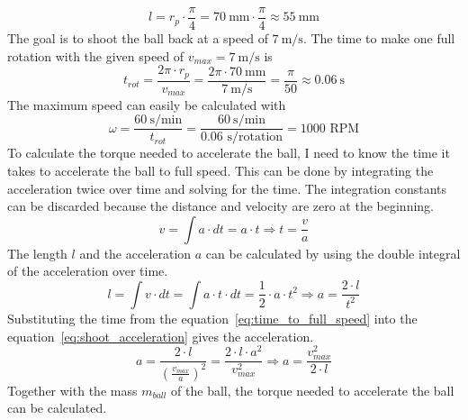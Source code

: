 \begin{equation}
    \label{eq:arc-length}
    l = r_p \cdot \frac{\pi}{4} = \qty[per-mode=symbol]{70}{\mm} \cdot \frac{\pi}{4} \approx \qty[per-mode=symbol]{55}{\mm}
\end{equation}
The goal is to shoot the ball back at a speed of $\qty[per-mode=symbol]{7}{\m\per\s}$.
The time to make one full rotation with the given speed of $v_{max}=\qty[per-mode=symbol]{7}{\m\per\s}$ is
\begin{equation}
    \label{eq:time-rot}
    t_{rot} = \frac{2\pi\cdot r_p}{v_{max}} = \frac{2\pi\cdot \qty[per-mode=symbol]{70}{\mm}}{\qty[per-mode=symbol]{7}{\m\per\s}} = \frac{\pi}{50} \approx \qty[per-mode=symbol]{0.06}{\s}
\end{equation}
The maximum speed can easily be calculated with
\begin{equation}
    \label{eq:max_speed}
    \omega = \frac{\qty[per-mode=symbol]{60}{\s\per\minute}}{t_{rot}} = \frac{\qty[per-mode=symbol]{60}{\s\per\minute}}{0.06\text{ s}/\text{rotation}} = 1000\text{ RPM}
\end{equation}
To calculate the torque needed to accelerate the ball, I need to know the time it takes to accelerate the ball to full speed.
This can be done by integrating the acceleration twice over time and solving for the time.
The integration constants can be discarded because the distance and velocity are zero at the beginning.
\begin{equation}
    \label{eq:time_to_full_speed}
    v = \int a \cdot dt = a \cdot t \Rightarrow t=\frac{v}{a}
\end{equation}
The length $l$ and the acceleration $a$ can be calculated by using the double integral of the acceleration over time.
\begin{equation}
    \label{eq:shoot_acceleration}
    l = \int v \cdot dt = \int a \cdot t \cdot dt = \frac{1}{2} \cdot a \cdot t^2 \Rightarrow a = \frac{2 \cdot l}{t^2}
\end{equation}
Substituting the time from the equation~\ref{eq:time_to_full_speed} into the equation~\ref{eq:shoot_acceleration} gives the acceleration.
\begin{equation}
    \label{eq:shoot_acceleration_substituted}
    a = \frac{2 \cdot l}{(\frac{v_{max}}{a})^2} = \frac{2 \cdot l \cdot a^2}{v_{max}^2} \Rightarrow a = \frac{v_{max}^2}{2 \cdot l}
\end{equation}
Together with the mass $m_{ball}$ of the ball, the torque needed to accelerate the ball can be calculated.

